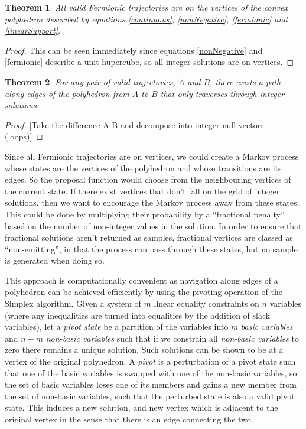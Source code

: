 \documentclass{article}
\newtheorem{theorem}{Theorem}
\begin{document}
\begin{theorem}
All valid Fermionic trajectories are on the vertices of the convex polyhedron described by equations \ref{continuous}, \ref{nonNegative}, \ref{fermionic} and \ref{linearSupport}.
\end{theorem}
\begin{proof}
This can be seen immediately since equations \ref{nonNegative} and \ref{fermionic} describe a unit hupercube, so all integer solutions are on vertices.
\end{proof}

\begin{theorem}
For any pair of valid trajectories, $A$ and $B$, there exists a path along edges of the polyhedron from $A$ to $B$ that only traverses through integer solutions.
\end{theorem}
\begin{proof}

[Take the difference A-B and decompose into integer null vectors (loops)]

\end{proof}

Since all Fermionic trajectories are on vertices, we could create a Markov process whose states are the vertices of the polyhedron and whose transitions are its edges. So the proposal function would choose from the neighbouring vertices of the current state. If there exist vertices that don't fall on the grid of integer solutions, then we want to encourage the Markov process away from these states. This could be done by multiplying their probability by a ``fractional penalty'' based on the number of non-integer values in the solution. In order to ensure that fractional solutions aren't returned as samples, fractional vertices are classed as ``non-emitting'', in that the process can pass through these states, but no sample is generated when doing so.

This approach is computationally convenient as navigation along edges of a polyhedron can be achieved efficiently by using the pivoting operation of the Simplex algorithm\cite{dantzig1955generalized}\cite{thie2011introduction}. Given a system of $m$ linear equality constraints on $n$ variables (where any inequalities are turned into equalities by the addition of slack variables), let a \textit{pivot state} be a partition of the variables into $m$ \textit{basic variables} and $n-m$ \textit{non-basic variables} such that if we constrain all \textit{non-basic variables} to zero there remains a unique solution. Such solutions can be shown to be at a vertex of the original polyhedron. A \textit{pivot} is a perturbation of a pivot state such that one of the basic variables is swapped with one of the non-basic variables, so the set of basic variables loses one of its members and gains a new member from the set of non-basic variables, such that the perturbed state is also a valid pivot state. This induces a new solution, and new vertex which is adjacent to the original vertex in the sense that there is an edge connecting the two.
\end{document}
